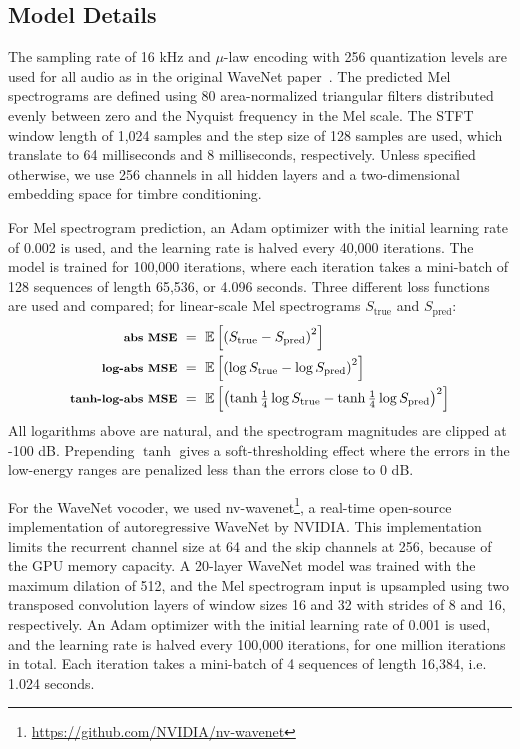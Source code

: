\subsection{Model Details}

The sampling rate of 16 kHz and $\mu$-law encoding with 256 quantization levels are used for all audio as in the original WaveNet paper~\cite{oord2016wavenet}.
The predicted Mel spectrograms are defined using 80 area-normalized triangular filters distributed evenly between zero and the Nyquist frequency in the Mel scale.
The STFT window length of 1,024 samples and the step size of 128 samples are used, which translate to 64 milliseconds and 8 milliseconds, respectively.
Unless specified otherwise, we use 256 channels in all hidden layers and a two-dimensional embedding space for timbre conditioning.

For Mel spectrogram prediction, an Adam optimizer with the initial learning rate of 0.002 is used, and the learning rate is halved every 40,000 iterations.
The model is trained for 100,000 iterations, where each iteration takes a mini-batch of 128 sequences of length 65,536, or 4.096 seconds.
Three different loss functions are used and compared; for linear-scale Mel spectrograms $S_{\mathrm{true}}$ and $S_{\mathrm{pred}}$:
\begin{align}
\footnotesize \textbf{abs MSE} & ~=~ \mathbb{E} \left [ \left ( S_{\mathrm{true}} - S_{\mathrm{pred}} \right )^2 \right ]
\label{eqn:abs-loss} \\
\footnotesize \textbf{log-abs MSE} & ~=~ \mathbb{E} \left [ \left ( \log S_{\mathrm{true}} - \log S_{\mathrm{pred}} \right )^2 \right ]
\label{eqn:log-abs-loss} \\
\footnotesize \textbf{tanh-log-abs MSE} & ~=~ \mathbb{E} \left [ \left ( \tanh \tfrac{1}{4}\log S_{\mathrm{true}} - \tanh \tfrac{1}{4}\log S_{\mathrm{pred}}  \right )^2 \right ]
\label{eqn:tanh-log-abs-loss}
\end{align}
\noindent All logarithms above are natural, and the spectrogram magnitudes are clipped at -100 dB. Prepending $\tanh$ gives a soft-thresholding effect where the errors in the low-energy ranges are penalized less than the errors close to 0 dB.

For the WaveNet vocoder, we used nv-wavenet\footnote{\url{https://github.com/NVIDIA/nv-wavenet}}, a real-time open-source implementation of autoregressive WaveNet by NVIDIA.
This implementation limits the recurrent channel size at 64 and the skip channels at 256, because of the GPU memory capacity.
A 20-layer WaveNet model was trained with the maximum dilation of 512, and the Mel spectrogram input is upsampled using two transposed convolution layers of window sizes 16 and 32 with strides of 8 and 16, respectively.
An Adam optimizer with the initial learning rate of 0.001 is used, and the learning rate is halved every 100,000 iterations, for one million iterations in total.
Each iteration takes a mini-batch of 4 sequences of length 16,384, i.e. 1.024 seconds.

